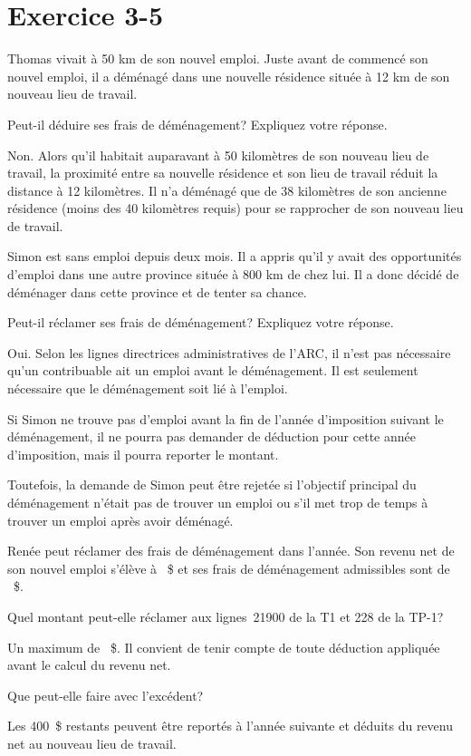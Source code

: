 \section{Exercice 3-5}
\setcounter{question}{0}
\begin{question}
	Thomas vivait à 50 km de son nouvel emploi. Juste avant de commencé son nouvel emploi, il a déménagé dans une nouvelle résidence située à 12 km de son nouveau lieu de travail.
	
	Peut-il déduire ses frais de déménagement? Expliquez votre réponse.
\end{question}
Non. Alors qu'il habitait auparavant à 50 kilomètres de son nouveau lieu de travail, la proximité entre sa nouvelle résidence et son lieu de travail réduit la distance à 12 kilomètres. Il n'a déménagé que de 38 kilomètres de son ancienne résidence (moins des 40 kilomètres requis) pour se rapprocher de son nouveau lieu de travail.

\begin{question}
	Simon est sans emploi depuis deux mois. Il a appris qu'il y avait des opportunités d'emploi dans une autre province située à 800 km de chez lui. Il a donc décidé de déménager dans cette province et de tenter sa chance.
	
	Peut-il réclamer ses frais de déménagement? Expliquez votre réponse.
\end{question}
Oui. Selon les lignes directrices administratives de l'ARC, il n'est pas nécessaire qu'un contribuable ait un emploi avant le déménagement. Il est seulement nécessaire que le déménagement soit lié à l'emploi.

Si Simon ne trouve pas d'emploi avant la fin de l'année d'imposition suivant le déménagement, il ne pourra pas demander de déduction pour cette année d'imposition, mais il pourra reporter le montant.

Toutefois, la demande de Simon peut être rejetée si l'objectif principal du déménagement n'était pas de trouver un emploi ou s'il met trop de temps à trouver un emploi après avoir déménagé.

\begin{question}
	Renée peut réclamer des frais de déménagement dans l'année. Son revenu net de son nouvel emploi s'élève à ~\$ et ses frais de déménagement admissibles sont de ~\$. 
\end{question}
\setcounter{sousQuestion}{0}
\begin{sousQuestion}
	Quel montant peut-elle réclamer aux lignes~21900 de la T1 et 228 de la TP-1?
\end{sousQuestion}
Un maximum de ~\$. Il convient de tenir compte de toute déduction appliquée avant le calcul du revenu net.
\begin{sousQuestion}
	Que peut-elle faire avec l'excédent?
\end{sousQuestion}
Les 400~\$ restants peuvent être reportés à l'année suivante et déduits du revenu net au nouveau lieu de travail.

